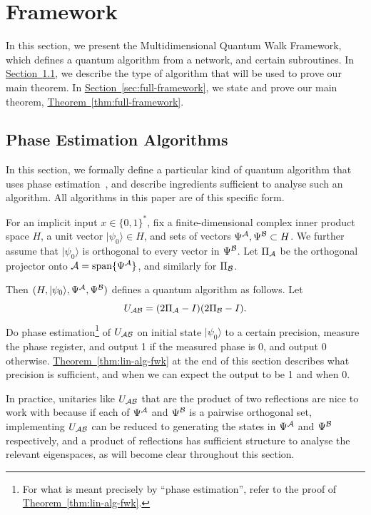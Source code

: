 \documentclass{theoretics}
\renewcommand{\sec}[1]{\hyperref[sec:#1]{Section~\ref*{sec:#1}}}
\newcommand{\thm}[1]{\hyperref[thm:#1]{Theorem~\ref*{thm:#1}}}
\def\ket#1{{\lvert}#1\rangle}
\renewcommand{\>}{\rangle}
\newcommand{\<}{\langle}
\renewcommand{\(}{\left(}
\renewcommand{\)}{\right)}
\begin{document}
\section{Framework}\label{sec:fwk}

In this section, we present the Multidimensional Quantum Walk Framework, which defines a quantum algorithm from a network, and certain subroutines. In \sec{phase-est}, we describe the type of algorithm that will be used to prove our main theorem. In \sec{full-framework}, we state and prove our main theorem, \thm{full-framework}. 

\subsection{Phase Estimation Algorithms}\label{sec:phase-est}

In this section, we formally define a particular kind of quantum algorithm that uses phase estimation~\cite{kitaev1996PhaseEst}, and describe ingredients sufficient to analyse such an algorithm. All algorithms in this paper are of this specific form. 

\begin{definition}\label{def:lin-alg}
For an implicit input $x\in\{0,1\}^*$, fix a finite-dimensional complex inner product space $H$, a unit vector $\ket{\psi_0}\in H$, and sets of vectors
$\Psi^{\cal A},\Psi^{\cal B}\subset H$. We further assume that $\ket{\psi_0}$ is orthogonal to every vector in $\Psi^{\cal B}$.  Let $\Pi_{\cal A}$ be the orthogonal projector onto ${\cal A}=\mathrm{span}\{\Psi^{\cal A}\}$, and similarly for $\Pi_{\cal B}$.
\end{definition}
Then $(H,\ket{\psi_0},\Psi^{\cal A},\Psi^{\cal B})$ defines a quantum algorithm as follows. Let 
\begin{equation}
U_{\cal AB}=(2\Pi_{\cal A}-I)(2\Pi_{\cal B}-I).\label{eq:U-AB}
\end{equation}
Do phase estimation\footnote{For what is meant precisely by ``phase estimation'', refer to the proof of \thm{lin-alg-fwk}.} of $U_{\cal AB}$ on initial state $\ket{\psi_0}$ to a certain precision, measure the phase register, and output 1 if the measured phase is 0, and output 0 otherwise. \thm{lin-alg-fwk} at the end of this section describes what precision is sufficient, and when we can expect the output to be 1 and when 0. 

In practice, unitaries like $U_{\cal AB}$ that are the product of two reflections are nice to work with because if each of $\Psi^{\cal A}$ and $\Psi^{\cal B}$ is a pairwise orthogonal set, implementing $U_{\cal AB}$ can be reduced to generating the states in $\Psi^{\cal A}$ and $\Psi^{\cal B}$ respectively, and a product of reflections has sufficient structure to analyse the relevant eigenspaces, as will become clear throughout this section. 
\end{document}
